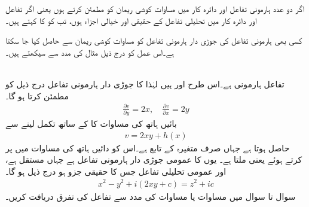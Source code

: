 اگر دو عدد ہارمونی تفاعل  اور  دائرہ کار  میں مساوات کوشی ریمان  کو مطمئن کرتے ہوں یعنی اگر تفاعل  اور  دائرہ کار  میں تحلیلی تفاعل  کے حقیقی اور خیالی اجزاء ہوں، تب کو  کا  کہتے ہیں۔

کسی بھی ہارمونی تفاعل کی جوڑی دار ہارمونی تفاعل کو مساوات کوشی ریمان سے حاصل کیا جا سکتا ہے۔اس عمل کو درج ذیل مثال کی مدد سے سیکھتے ہیں۔

\quad {}\\
تفاعل  ہارمونی ہے۔اس طرح اور  ہیں لہٰذا  کا جوڑی دار ہارمونی تفاعل درج ذیل کو مطمئن کرتا ہو گا۔
\begin{align*}
\frac{\partial v}{\partial y}=2x,\quad \frac{\partial v}{\partial x}=2y
\end{align*}
بائیں ہاتھ کی مساوات کا  کے ساتھ تکمل لینے سے 
\begin{align*}
v=2xy+h(x)
\end{align*}
حاصل ہوتا ہے جہاں  صرف متغیرہ  کے تابع ہے۔اس کو دائیں ہاتھ کی مساوات میں پر کرتے ہوئے  یعنی  ملتا ہے۔ یوں  کا عمومی جوڑی دار ہارمونی تفاعل  ہے جہاں  مستقل ہے، اور عمومی تحلیلی تفاعل جس کا حقیقی جزو  ہو درج ذیل ہو گا۔
\begin{align*}
x^2-y^2+i(2xy+c)=z^2+ic
\end{align*}
سوال  تا سوال  میں مساوات  یا مساوات  کی مدد سے تفاعل کی تفرق دریافت کریں۔


